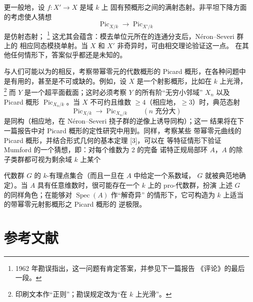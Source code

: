  更一般地，设 $f:X'\longrightarrow X$ 是域 $k$ 上
固有预概形之间的满射态射。非平坦下降方面的考虑使人猜想
\[
\operatorname{Pic}_{X/k}\longrightarrow\operatorname{Pic}_{X'/k}
\]
是仿射态射；
\footnote{1962 年勘误指出，这一问题有肯定答案，并参见下一篇报告
《评论》的最后一段。}
这尤其会蕴含：模去单位元所在的连通分支后，Néron--Severi 群上的
相应同态模挠单射。当 $X$ 和 $X'$ 非奇异时，可由相交理论验证这一点。
在其他任何情形下，答案似乎都还是未知的。

 与人们可能以为的相反，考察带幂零元的代数概形的
Picard 概形，在各种问题中是有用的，甚至是不可或缺的。例如，设 $X$
是一个射影概形，比如在 $k$ 上光滑，
\footnote{印刷文本作“正则”；勘误规定改为“在 $k$ 上光滑”。}
而 $Y$ 是一个超平面截面；这时必须考察 $Y$ 的所有阶“无穷小邻域”
$X_n$ 以及 Picard 概形 $\operatorname{Pic}_{X_n/k}$。当 $X$
不可约且维数 $\geq4$（相应地，$\geq3$）时，典范态射
\[
\operatorname{Pic}_{X/k}\longrightarrow\operatorname{Pic}_{X_n/k}
\qquad(n\text{ 充分大})
\]
是同构（相应地，在 Néron--Severi 挠子群的逆像上诱导同构）；这一
结果将在下一篇报告中对 Picard 概形的定性研究中用到。同样，考察某些
带幂零元曲线的 Picard 概形，并结合形式几何的基本定理 [3]，可以在
等特征情形下验证 Mumford 的一个猜想，即：对每个维数为 2 的完备
诺特正规局部环 $A$，$A$ 的除子类群都可视为剩余域 $k$ 上某个

代数群 $G$ 的 $k$-有理点集合（而且一旦在 $A$ 中给定一个系数域，
$G$ 就被典范地确定）。当 $A$ 具有任意维数时，很可能存在一个 $k$
上的 pro-代数群，扮演
上述 $G$ 的同样角色；在能够对 $\operatorname{Spec}(A)$ 作“解奇异”
的情形下，它可构造为 $k$ 上适当的带幂零元射影概形之 Picard 概形的
逆极限。

\section*{参考文献}

